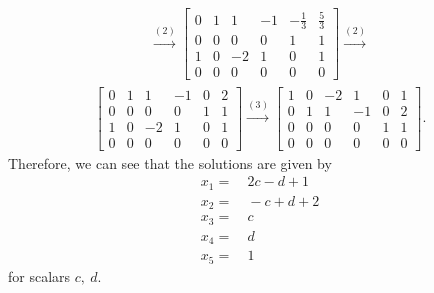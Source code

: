 \documentclass[12pt]{article}
\begin{document}
\begin{enumerate}
\begin{align*}
      \xrightarrow{(2)}
      \begin{bmatrix}
        0 & 1 & 1  & -1 & -\frac{1}{3} & \frac{5}{3}\\
        0 & 0 & 0  & 0  & 1            & 1\\
        1 & 0 & -2 & 1  & 0            & 1\\
        0 & 0 & 0  & 0  & 0            & 0
      \end{bmatrix}
      \xrightarrow{(2)}
    \end{align*}
    \begin{align*}
      \begin{bmatrix}
        0 & 1 & 1  & -1 & 0 & 2\\
        0 & 0 & 0  & 0  & 1 & 1\\
        1 & 0 & -2 & 1  & 0 & 1\\
        0 & 0 & 0  & 0  & 0 & 0
      \end{bmatrix}
      \xrightarrow{(3)}
      \begin{bmatrix}
        1 & 0 & -2 & 1  & 0 & 1\\
        0 & 1 & 1  & -1 & 0 & 2\\
        0 & 0 & 0  & 0  & 1 & 1\\
        0 & 0 & 0  & 0  & 0 & 0
      \end{bmatrix}.
    \end{align*}
    Therefore, we can see that the solutions are given by
    \begin{align*}
      x_1 =&\ 2c - d + 1\\
      x_2 =&\ -c + d + 2\\
      x_3 =&\ c\\
      x_4 =&\ d\\
      x_5 =&\ 1
    \end{align*}
    for scalars $c,\ d$.
\end{enumerate}
\end{document}
